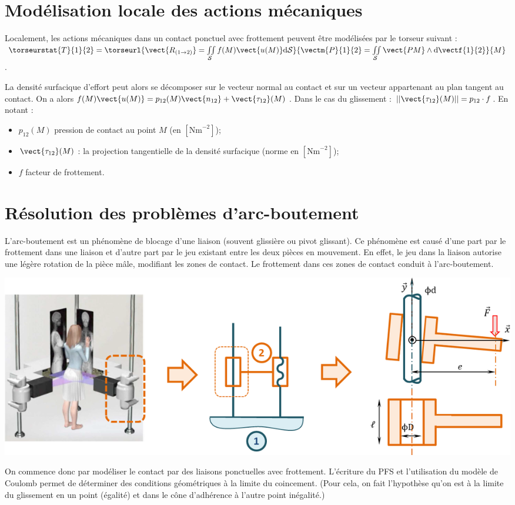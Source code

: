 \documentclass[10pt,fleqn]{article} %
\begin{document}
\section{Modélisation locale des actions mécaniques}
\begin{defi}
Localement, les actions mécaniques dans un contact ponctuel avec frottement peuvent être modélisées par le torseur suivant :
$
\torseurstat{T}{1}{2}=
\torseurl{%
\vect{R_{(1\rightarrow 2)}} 
= \iint\limits_{\mathcal{S}} f(M) \vect{u(M)} \text{d}\mathcal{S}}{%
\vectm{P}{1}{2} = \iint\limits_{\mathcal{S}}\vect{PM}\wedge \text{d}\vectf{1}{2}}{M}
$.

La densité surfacique d'effort peut alors se décomposer sur le vecteur normal au contact et sur un vecteur appartenant au plan tangent au contact. On a alors$f(M) \vect{u(M)} = p_{12}(M)\vect{n_{12}}+\vect{\tau_{12}}(M)$. 
Dans le cas du glissement : $||\vect{\tau_{12}}(M)||=p_{12}\cdot f$.
En notant : 
\begin{itemize}
\item $p_{12}(M)$ pression de contact au point $M$ (en $\left[\text{Nm}^{-2}\right]$);
\item $\vect{\tau_{12}}(M)$ : la projection tangentielle de la densité surfacique (norme en $\left[\text{Nm}^{-2}\right]$);
\item $f$ facteur de frottement.
\end{itemize}
\end{defi}

\section{Résolution des problèmes d'arc-boutement}
L'arc-boutement est un phénomène de blocage d'une liaison (souvent glissière ou pivot glissant). Ce phénomène est causé d'une part par le frottement dans une liaison et d'autre part par le jeu existant entre les deux pièces en mouvement. En effet, le jeu dans la liaison autorise une légère rotation de la pièce mâle, modifiant les zones de contact. Le frottement dans ces zones de contact conduit à l'arc-boutement. 

\begin{center}
\includegraphics[width=\linewidth]{images/fig_05}
\end{center}

On commence donc par modéliser le contact par des liaisons ponctuelles avec frottement. L'écriture du PFS et l'utilisation du modèle de Coulomb permet de déterminer des conditions géométriques à la limite du coincement. 
(Pour cela, on fait l'hypothèse qu'on est à la limite du glissement en un point (égalité) et dans le cône d'adhérence à l'autre point inégalité.) 
\end{document}
